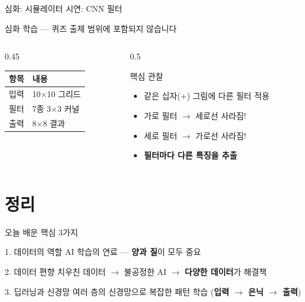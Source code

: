 \documentclass[aspectratio=169]{beamer}
\begin{document}
\begin{frame}{ 심화:  시뮬레이터 시연: CNN 필터}
\begin{center}
\small \textcolor{primary}{ 심화 학습 — 퀴즈 출제 범위에 포함되지 않습니다}
\end{center}
\vspace{0.2cm}
\begin{columns}
\begin{column}{0.45\textwidth}
\begin{center}
\begin{tabular}{|c|l|}
\hline
\rowcolor{tableheader}
\textbf{항목} & \textbf{내용} \\
\hline
입력 & 10×10 그리드 \\
\hline
필터 & 7종 3×3 커널 \\
\hline
출력 & 8×8 결과 \\
\hline
\end{tabular}
\end{center}
\end{column}
\begin{column}{0.5\textwidth}
\begin{block}{ 핵심 관찰}
\begin{itemize}
\item 같은 십자(+) 그림에 다른 필터 적용
\item 가로 필터 $\rightarrow$ 세로선 사라짐!
\item 세로 필터 $\rightarrow$ 가로선 사라짐!
\item \textbf{필터마다 다른 특징을 추출}
\end{itemize}
\end{block}
\end{column}
\end{columns}
\end{frame}

\section{ 정리}

\begin{frame}{오늘 배운 핵심 3가지}
\begin{block}{ 1. 데이터의 역할}
AI 학습의 연료 — \textbf{양과 질}이 모두 중요
\end{block}

\begin{block}{ 2. 데이터 편향}
치우친 데이터 $\rightarrow$ 불공정한 AI $\rightarrow$ \textbf{다양한 데이터}가 해결책
\end{block}

\begin{block}{ 3. 딥러닝과 신경망}
여러 층의 신경망으로 복잡한 패턴 학습 (\textbf{입력 $\rightarrow$ 은닉 $\rightarrow$ 출력})
\end{block}
\end{frame}
\end{document}
